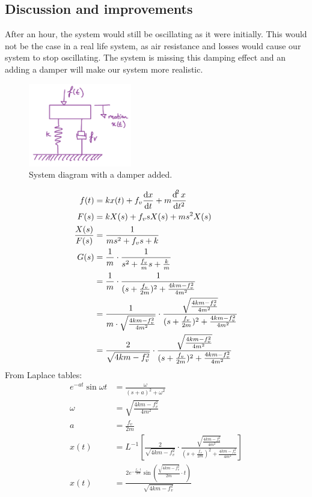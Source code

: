 \documentclass[12pt]{article}
\numberwithin{equation}{section}
\begin{document}
\subsection*{Discussion and improvements}
After an hour, the system would still be oscillating as it were initially. This would not be the case in a real life system, as air resistance and losses would cause our system to stop oscillating. The system is missing this damping effect and an adding a damper will make our system more realistic.
\begin{figure}[H]
  \centering
  \includegraphics[width=0.4\textwidth]{./img/3-3dampedsystem.png}
  \caption{System diagram with a damper added.}
\end{figure}
\begin{align}
  f(t) &= kx(t) + f_v \frac{\dif x}{\dif t} + m \frac{\dif ^2 x}{\dif t^2}\\
  F(s) &= kX(s) + f_v s X(s) + m s^2 X(s)\\
  \frac{X(s)}{F(s)} &= \frac{1}{ms^2 + f_v s + k}\\
  G(s) &= \frac{1}{m}\cdot \frac{1}{s^2 + \frac{f_v}{m}s + \frac{k}{m}}\\
  &= \frac{1}{m} \cdot \frac{1}{(s+\frac{f_v}{2m})^2 +\frac{4km - f_v^2}{4m^2}}\\
  &= \frac{1}{m \cdot \sqrt{\frac{4km - f_v^2}{4m^2}}} \cdot \frac{\sqrt{\frac{4km - f_v^2}{4m^2}}}{(s+\frac{f_v}{2m})^2 +\frac{4km - f_v^2}{4m^2}}\\
  &= \frac{2}{\sqrt{4km - f_v^2}} \cdot \frac{\sqrt{\frac{4km - f_v^2}{4m^2}}}{(s+\frac{f_v}{2m})^2 +\frac{4km - f_v^2}{4m^2}}
\end{align}
From Laplace tables: 
\begin{align}
  e^{-at}\sin{\omega t} &= \frac{\omega}{(s + a)^2 + \omega^2}\\
  \omega &= \sqrt{\frac{4km - f_v^2}{4m^2}}\\
  a &= \frac{f_v}{2m}\\
  x(t) &= L^{-1} \left[ \frac{2}{\sqrt{4km - f_v^2}} \cdot \frac{\sqrt{\frac{4km - f_v^2}{4m^2}}}{(s+\frac{f_v}{2m})^2 +\frac{4km - f_v^2}{4m^2}} \right]\\
  x(t) &= \frac{2e^{-\frac{f_v \cdot t}{2m}}\sin{\left(\frac{\sqrt{4km-f_v^2 }}{2m} \cdot t\right)}}{\sqrt{4km - f_v^2}}
\end{align}
\end{document}
